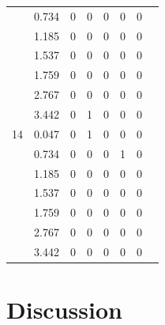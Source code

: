 \begin{table}[H]
\begin{center}
\begin{tabular}{cccccccc}
          &       0.734      &       0      &       0      &       0      &       0      &       0 \\
          &       1.185      &       0      &       0      &       0      &       0      &       0 \\
          &       1.537      &       0      &       0      &       0      &       0      &       0 \\
          &       1.759      &       0      &       0      &       0      &       0      &       0 \\
          &       2.767      &       0      &       0      &       0      &       0      &       0 \\
          &       3.442      &       0      &       1      &       0      &       0      &       0 \\
  14      &       0.047      &       0      &       1      &       0      &       0      &       0 \\
          &       0.734      &       0      &       0      &       0      &       1      &       0 \\
          &       1.185      &       0      &       0      &       0      &       0      &       0 \\ 
          &       1.537      &       0      &       0      &       0      &       0      &       0 \\
          &       1.759      &       0      &       0      &       0      &       0      &       0 \\
          &       2.767      &       0      &       0      &       0      &       0      &       0 \\
          &       3.442      &       0      &       0      &       0      &       0      &       0 \\
      \bottomrule
    \end{tabular}
  \end{center}
\end{table}

\pagebreak
\section {Discussion}
